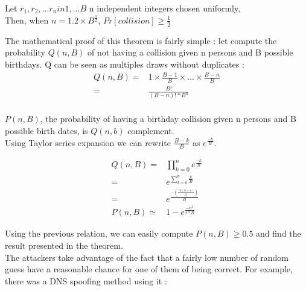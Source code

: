 \begin{mytheorem}
Let $r_1,r_2,...r_n in {1,...B}$ n independent integers chosen uniformly, \\
Then, when $n = 1.2\times B^{\frac{1}{2}}$, $Pr[collision] \geq \frac{1}{2} $
\end{mytheorem}

The mathematical proof of this theorem is fairly simple : let compute the probability $Q(n,B)$ of not having a collision given n persons and B possible birthdays. Q can be seen as multiples draws without duplicates : \\
\begin{align}
    Q(n,B) =& 1 \times \frac{B-1}{B} \times ... \times \frac{B-n}{B} \\
           =& \frac{B!}{(B-n)!*B^n} \\
\end{align}  

$P(n,B)$, the probability of having a birthday collision given n persons and B possible birth dates, is $Q(n,b)$ complement. \\
Using Taylor series expansion we can rewrite $\frac{B-k}{B}$ as $e^{\frac{-k}{B}}$. 

\begin{align}
    Q(n,B) =& \prod_{k = 0}^n e^{\frac{-k}{B}}      \\
           =& e^{\sum_{k = 0}^n \frac{k}{B}}        \\
           =& e^{ \frac{-(\frac{*n(n-1)}{2})}{B} }  \\
    P(n,B) \simeq& 1 - e^{ \frac{-n^2}{2*B} }       
\end{align}  


Using the previous relation, we can easily compute $P(n,B) \geq 0.5$ and find the result presented in the theorem.\\

The attackers take advantage of the fact that a fairly low number of random guess have a reasonable chance for one of them of being correct. For example, there was a DNS spoofing method using it : \\

